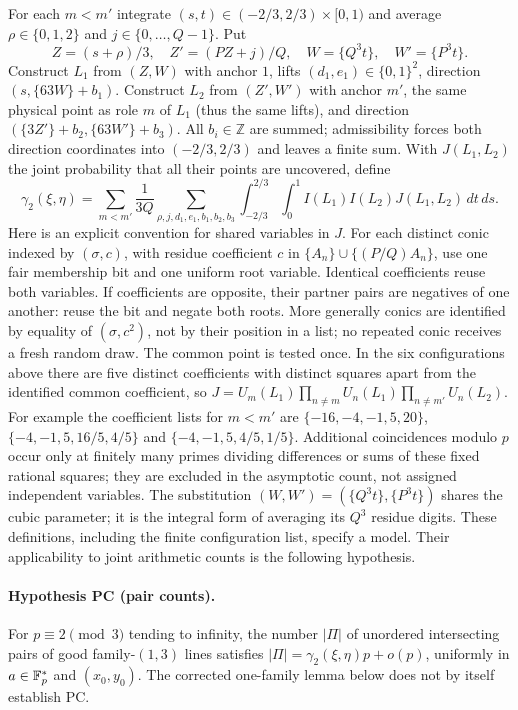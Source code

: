 For each $m<m'$ integrate $(s,t)\in(-2/3,2/3)\times[0,1)$ and average $\rho\in\{0,1,2\}$ and $j\in\{0,\dots,Q-1\}$.
Put
\[
 Z=(s+\rho)/3,\quad Z'=(PZ+j)/Q,\quad W=\{Q^3t\},\quad W'=\{P^3t\}.
\]
Construct $L_1$ from $(Z,W)$ with anchor $1$, lifts $(d_1,e_1)\in\{0,1\}^2$, direction $(s,\{63W\}+b_1)$.
Construct $L_2$ from $(Z',W')$ with anchor $m'$, the same physical point as role $m$ of $L_1$ (thus the same lifts),
and direction $(\{3Z'\}+b_2,\{63W'\}+b_3)$.
All $b_i\in\mathbb Z$ are summed; admissibility forces both direction coordinates into $(-2/3,2/3)$ and leaves a finite sum.
With $J(L_1,L_2)$ the joint probability that all their points are uncovered, define
\begin{equation}\label{eq:gamma2}
 \gamma_2(\xi,\eta)=\sum_{m<m'}\frac1{3Q}
 \sum_{\rho,j,d_1,e_1,b_1,b_2,b_3}\int_{-2/3}^{2/3}\!\int_0^1
 I(L_1)I(L_2)J(L_1,L_2)\,dt\,ds .
\end{equation}
Here is an explicit convention for shared variables in $J$.
For each distinct conic indexed by $(\sigma,c)$, with residue coefficient $c$ in
$\{A_n\}\cup\{(P/Q)A_n\}$, use one fair membership bit and one uniform root variable.
Identical coefficients reuse both variables.  If coefficients are opposite, their partner pairs are negatives of one another:
reuse the bit and negate both roots.  More generally conics are identified by equality of $(\sigma,c^2)$,
not by their position in a list; no repeated conic receives a fresh random draw.
The common point is tested once.  In the six configurations above there are five distinct coefficients with distinct squares
apart from the identified common coefficient, so
$J=U_m(L_1)\prod_{n\ne m}U_n(L_1)\prod_{n\ne m'}U_n(L_2)$.
For example the coefficient lists for $m<m'$ are
$\{-16,-4,-1,5,20\}$, $\{-4,-1,5,16/5,4/5\}$ and
$\{-4,-1,5,4/5,1/5\}$.
Additional coincidences modulo $p$ occur only at finitely many primes dividing differences or sums of these fixed rational squares;
they are excluded in the asymptotic count, not assigned independent variables.
The substitution $(W,W')=(\{Q^3t\},\{P^3t\})$ shares the cubic parameter; it is the integral form of averaging its $Q^3$ residue digits.
These definitions, including the finite configuration list, specify a model.  Their applicability to joint arithmetic counts is the following hypothesis.

\paragraph{Hypothesis PC (pair counts).}\label{hyp:pair}
For $p\equiv2\pmod3$ tending to infinity, the number $|\Pi|$ of unordered intersecting pairs of good family-$(1,3)$ lines satisfies
$|\Pi|=\gamma_2(\xi,\eta)p+o(p)$, uniformly in $a\in\mathbb{F}_p^*$ and $(x_0,y_0)$.
The corrected one-family lemma below does not by itself establish PC.

